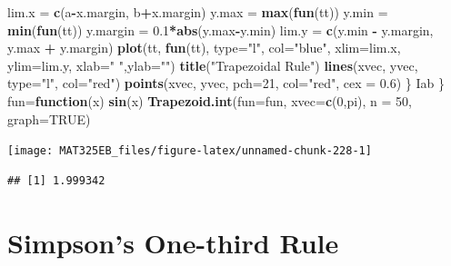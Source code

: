 \documentclass[
]{book}
\newenvironment{Shaded}{\begin{snugshade}}{\end{snugshade}}
\newcommand{\AttributeTok}[1]{\textcolor[rgb]{0.13,0.29,0.53}{#1}}
\newcommand{\ConstantTok}[1]{\textcolor[rgb]{0.56,0.35,0.01}{#1}}
\newcommand{\ControlFlowTok}[1]{\textcolor[rgb]{0.13,0.29,0.53}{\textbf{#1}}}
\newcommand{\DecValTok}[1]{\textcolor[rgb]{0.00,0.00,0.81}{#1}}
\newcommand{\FloatTok}[1]{\textcolor[rgb]{0.00,0.00,0.81}{#1}}
\newcommand{\FunctionTok}[1]{\textcolor[rgb]{0.13,0.29,0.53}{\textbf{#1}}}
\newcommand{\NormalTok}[1]{#1}
\newcommand{\OtherTok}[1]{\textcolor[rgb]{0.56,0.35,0.01}{#1}}
\newcommand{\SpecialCharTok}[1]{\textcolor[rgb]{0.81,0.36,0.00}{\textbf{#1}}}
\newcommand{\StringTok}[1]{\textcolor[rgb]{0.31,0.60,0.02}{#1}}
\begin{document}
\begin{Shaded}
\begin{Highlighting}[]
\NormalTok{      lim.x }\OtherTok{=} \FunctionTok{c}\NormalTok{(a}\SpecialCharTok{{-}}\NormalTok{x.margin, b}\SpecialCharTok{+}\NormalTok{x.margin)}
\NormalTok{      y.max }\OtherTok{=} \FunctionTok{max}\NormalTok{(}\FunctionTok{fun}\NormalTok{(tt))}
\NormalTok{      y.min }\OtherTok{=} \FunctionTok{min}\NormalTok{(}\FunctionTok{fun}\NormalTok{(tt))}
\NormalTok{      y.margin }\OtherTok{=} \FloatTok{0.1}\SpecialCharTok{*}\FunctionTok{abs}\NormalTok{(y.max}\SpecialCharTok{{-}}\NormalTok{y.min)}
\NormalTok{      lim.y }\OtherTok{=} \FunctionTok{c}\NormalTok{(y.min }\SpecialCharTok{{-}}\NormalTok{ y.margin, y.max }\SpecialCharTok{+}\NormalTok{ y.margin)}
      \FunctionTok{plot}\NormalTok{(tt, }\FunctionTok{fun}\NormalTok{(tt), }\AttributeTok{type=}\StringTok{"l"}\NormalTok{, }\AttributeTok{col=}\StringTok{"blue"}\NormalTok{, }\AttributeTok{xlim=}\NormalTok{lim.x, }\AttributeTok{ylim=}\NormalTok{lim.y, }\AttributeTok{xlab=}\StringTok{" "}\NormalTok{,}\AttributeTok{ylab=}\StringTok{""}\NormalTok{)}
      \FunctionTok{title}\NormalTok{(}\StringTok{"Trapezoidal Rule"}\NormalTok{)}
      \FunctionTok{lines}\NormalTok{(xvec, yvec, }\AttributeTok{type=}\StringTok{"l"}\NormalTok{, }\AttributeTok{col=}\StringTok{"red"}\NormalTok{)}
      \FunctionTok{points}\NormalTok{(xvec, yvec, }\AttributeTok{pch=}\DecValTok{21}\NormalTok{, }\AttributeTok{col=}\StringTok{"red"}\NormalTok{, }\AttributeTok{cex =} \FloatTok{0.6}\NormalTok{)}
\NormalTok{    \}}
\NormalTok{  Iab}
\NormalTok{\}}
\NormalTok{fun}\OtherTok{=}\ControlFlowTok{function}\NormalTok{(x) }\FunctionTok{sin}\NormalTok{(x)}
\FunctionTok{Trapezoid.int}\NormalTok{(}\AttributeTok{fun=}\NormalTok{fun, }\AttributeTok{xvec=}\FunctionTok{c}\NormalTok{(}\DecValTok{0}\NormalTok{,pi), }\AttributeTok{n =} \DecValTok{50}\NormalTok{, }\AttributeTok{graph=}\ConstantTok{TRUE}\NormalTok{)}
\end{Highlighting}
\end{Shaded}

\begin{center}\texttt{[image: MAT325EB\_files/figure-latex/unnamed-chunk-228-1]} \end{center}

\begin{verbatim}
## [1] 1.999342
\end{verbatim}

\hfill\break

\hypertarget{simpsons-one-third-rule}{%
\section{Simpson's One-third Rule}\label{simpsons-one-third-rule}}
\end{document}
